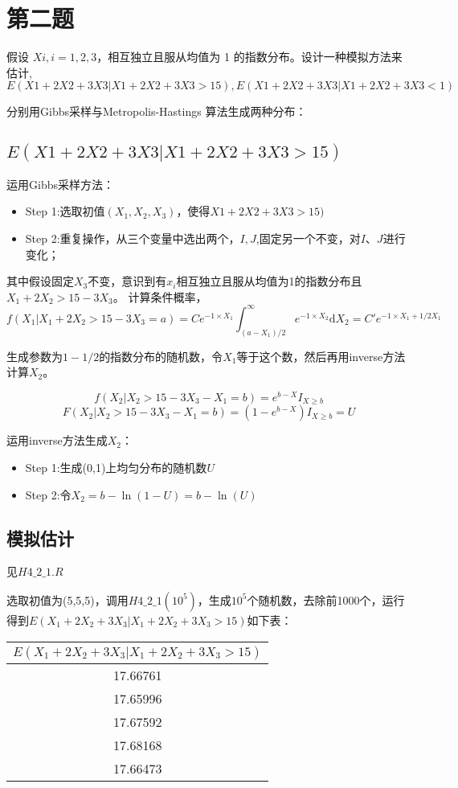 \documentclass{ctexart}
\begin{document}
\section{第二题}

假设 \(Xi, i = 1, 2, 3\)，相互独立且服从均值为 1 的指数分布。设计一种模拟方法来估计,\(E(X1+2X2+3X3 |X1+2X2+3X3 >15),E(X1+2X2+3X3 |X1+2X2+3X3 <1)\)

分别用Gibbs采样与Metropolis-Hastings 算法生成两种分布：

\subsection{\(E(X1+2X2+3X3|X1+2X2+3X3 >15)\)}

运用Gibbs采样方法：
\begin{itemize} 
\item Step 1:选取初值\((X_1,X_2,X_3)\)，使得\(X1+2X2+3X3 >15)\)
\item Step 2:重复操作，从三个变量中选出两个，\(I,J\),固定另一个不变，对\(I、J\)进行变化；
\end{itemize}

其中假设固定\(X_3\)不变，意识到有\(x_i\)相互独立且服从均值为1的指数分布且\(X_1+2X_2>15-3X_3\)。
计算条件概率，
\[ f(X_1|X_1+2X_2>15-3X_3=a) = C e^{-1\times X_1} \int^{\infty}_{(a-X_1)/2} e^{-1\times X_2} \mbox{d} X_2 =C' e^{-1 \times X_1 +1/2 X_1} \]

生成参数为\(1-1/2\)的指数分布的随机数，令\(X_1\)等于这个数，然后再用inverse方法计算\(X_2\)。

\[f(X_2|X_2>15-3X_3-X_1=b)=e^{b-X}I_{X\geq b}\]
\[F(X_2|X_2>15-3X_3-X_1=b)=(1-e^{b-X})I_{X\geq b}=U\]

运用inverse方法生成\(X_2\)：
\begin{itemize} 
\item Step 1:生成(0,1)上均匀分布的随机数\(U\)
\item Step 2:令\(X_2=b-\ln (1-U)=b-\ln (U)\)
\end{itemize}

\subsection{模拟估计}

见\(H4\_2\_1.R\)

选取初值为(5,5,5)，调用\(H4\_2\_1(10^5)\)，生成\(10^5\)个随机数，去除前1000个，运行得到\(E(X_1+2X_2+3X_3 | X_1+2X_2+3X_3 >15)\)如下表：
\begin{table}[h]
\centering
\begin{tabular}{| c | }
          \hline
          \bf $E(X_1+2X_2+3X_3 | X_1+2X_2+3X_3 >15)$  \\
          \hline
   17.66761 \\
          \hline
 17.65996\\
          \hline
      17.67592\\
          \hline
 17.68168\\
\hline
17.66473\\
\hline
\end{tabular}
\end{table}
\end{document}
